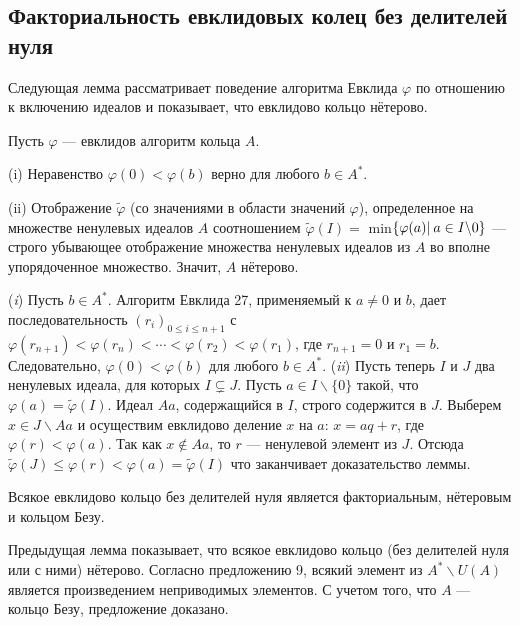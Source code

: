 \documentclass{mai_book}
\begin{document}
\subsection{Факториальность евклидовых колец без делителей нуля}
Следующая лемма рассматривает поведение алгоритма Евклида $\varphi$ по отношению к включению идеалов и показывает, что евклидово кольцо нётерово.\newline
\begin{lemma}

\hspace*{15pt}Пусть $\varphi$ — евклидов алгоритм кольца $A$.

(i) Неравенство $\varphi(0) < \varphi(b)$ верно для любого $b \in A^*.$

(ii) Отображение $\tilde{\varphi}$ (со значениями в области значений $\varphi$),  
определенное на множестве ненулевых идеалов $A$ соотношением  $\tilde{\varphi}(I) =$ min$\{\varphi(a)\:\newline |\: a \in I \backslash 0\} $
 — строго убывающее отображение множества 
ненулевых идеалов из $A$ во вполне упорядоченное множество. Значит, $A$ нётерово. 
\end{lemma}
\pagebreak

\begin{myproof}
(\textit{i}) Пусть $b \in A^*$. Алгоритм Евклида 27, применяемый к $a \neq 0$ и $b$, дает последовательность $(r_i)_{0\leqslant i\leqslant n+1}$ с $\varphi(r_{n+1})< \varphi(r_n)< \cdots < \varphi(r_2) <\varphi(r_1)$, где $r_{n+1} = 0$ и $r_1 = b$. Следовательно, $\varphi(0) < \varphi(b)$ для любого $b \in A^*$.\newline
(\textit{ii}) Пусть теперь $I$ и $J$ два ненулевых идеала, для которых $I \subsetneq J$. Пусть $a \in I \backslash  \{0\}$ такой, что $\varphi(a) = \tilde{\varphi}(I)$. Идеал $Aa$, содержащийся в $I$, строго содержится в $J$. Выберем $x \in J \backslash Aa$ и осуществим евклидово деление $x$ на $a$: $x = aq + r$, где $\varphi(r) < \varphi(a)$. Так как $x \notin Aa$, то $r$ — ненулевой элемент из $J$. Отсюда $\tilde{\varphi}(J)\leqslant \varphi(r) < \varphi(a) =\tilde{\varphi}(I)$ что заканчивает доказательство леммы.
\end{myproof}

\begin{predl}
\hspace*{15pt}Всякое евклидово кольцо без делителей нуля является факториальным, нётеровым и кольцом Безу.
\end{predl}


\begin{myproof}
Предыдущая лемма показывает, что всякое евклидово кольцо (без делителей нуля или с ними) нётерово. Согласно предложению 9, всякий элемент из $A^* \backslash U(A)$ является произведением неприводимых элементов. С учетом того, что $A$ — кольцо Безу, предложение доказано.
\end{myproof}
\end{document}
